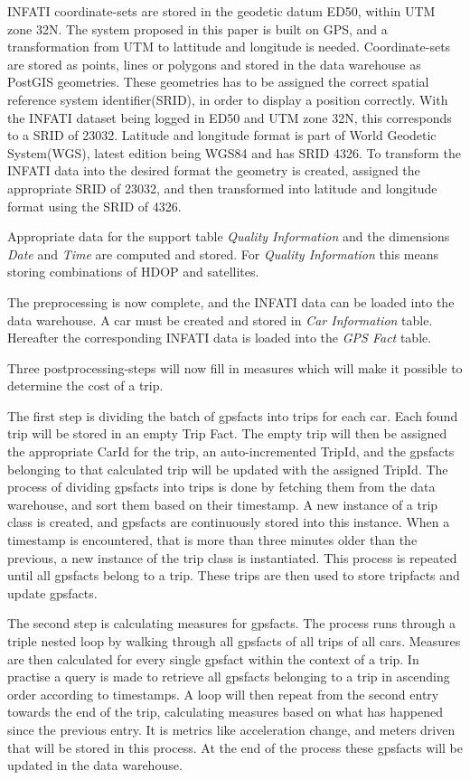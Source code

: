 INFATI coordinate-sets are stored in the geodetic datum ED50, within UTM zone 32N. The system proposed in this paper is built on GPS, and a transformation from UTM to lattitude and longitude is needed. Coordinate-sets are stored as points, lines or polygons and stored in the data warehouse as PostGIS\cite{postgis} geometries. These geometries has to be assigned the correct spatial reference system identifier(SRID), in order to display a position correctly. With the INFATI dataset being logged in ED50 and UTM zone 32N, this corresponds to a SRID of 23032\cite{UTM32N}. Latitude and longitude format is part of World Geodetic System(WGS), latest edition being WGS84 and has SRID 4326\cite{WGS84}. To transform the INFATI data into the desired format the geometry is created, assigned the appropriate SRID of 23032, and then transformed into latitude and longitude format using the SRID of 4326. 

Appropriate data for the support table \textit{Quality Information} and the dimensions \textit{Date} and \textit{Time} are computed and stored. For \textit{Quality Information} this means storing combinations of HDOP and satellites.

The preprocessing is now complete, and the INFATI data can be loaded into the data warehouse. A car must be created and stored in \textit{Car Information} table. Hereafter the corresponding INFATI data is loaded into the \textit{GPS Fact} table. 

Three postprocessing-steps will now fill in measures which will make it possible to determine the cost of a trip. 

The first step is dividing the batch of gpsfacts into trips for each car. Each found trip will be stored in an empty Trip Fact. The empty trip will then be assigned the appropriate CarId for the trip, an auto-incremented TripId, and the gpsfacts belonging to that calculated trip will be updated with the assigned TripId. The process of dividing gpsfacts into trips is done by fetching them from the data warehouse, and sort them based on their timestamp. A new instance of a trip class is created, and gpsfacts are continuously stored into this instance. When a timestamp is encountered, that is more than three minutes older than the previous, a new instance of the trip class is instantiated. This process is repeated until all gpsfacts belong to a trip. These trips are then used to store tripfacts and update gpsfacts.

The second step is calculating measures for gpsfacts. The process runs through a triple nested loop by walking through all gpsfacts of all trips of all cars. Measures are then calculated for every single gpsfact within the context of a trip. In practise a query is made to retrieve all gpsfacts belonging to a trip in ascending order according to timestamps. A loop will then repeat from the second entry towards the end of the trip, calculating measures based on what has happened since the previous entry. It is metrics like acceleration change, and meters driven that will be stored in this process. At the end of the process these gpsfacts will be updated in the data warehouse.

